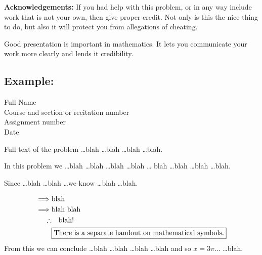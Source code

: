 {\bf Acknowledgements:} If you had help with this problem, or in any
way include work that is not your own, then give proper credit. Not
only is this the nice thing to do, but also it will protect you from
allegations of cheating.

Good presentation is important in mathematics. It lets you communicate your
work more clearly and lends it credibility.


\secondpage

\subsection*{Example:}

\begin{goodexample}

\begin{flushright}
Full Name\\
Course and section or recitation number\\
Assignment number\\
Date\\
\end{flushright}

 Full text of the problem \ldots blah \ldots blah \ldots blah \ldots blah.

\vspace{\baselineskip}

In this problem we \ldots blah \ldots blah \ldots blah \ldots blah \ldots
blah \ldots blah \ldots blah \ldots blah. \\ 

\vspace{\baselineskip}

Since \ldots blah \ldots blah \ldots we know \ldots blah \ldots blah.\\

\begin{align*}
\implies & \mbox{blah}\\
\implies & \mbox{blah blah}\\
\therefore & \quad \mbox{blah!}\\
& \fbox{\rm There is a separate handout on mathematical symbols.}
\end{align*}
From this we can conclude \ldots blah \ldots blah \ldots blah \ldots blah
and so $x=3\pi\ldots$ \ldots blah. \\
\noindent{}


\end{goodexample}
